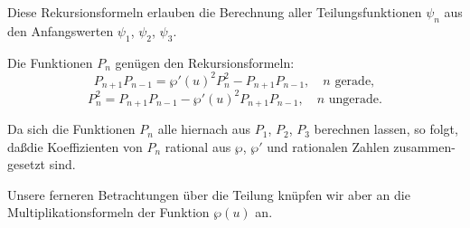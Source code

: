 \documentclass[12pt,a4paper]{article}
\theoremstyle{definition}
\begin{document}
Diese Rekursionsformeln erlauben die Berechnung aller
Teilungsfunktionen $\psi_n$ aus den Anfangswerten $\psi_1$, $\psi_2$, $\psi_3$.

Die Funktionen $P_n$ gen\"{u}gen den Rekursionsformeln:
\begin{equation}\tag{6}
P_{n+1}P_{n-1} = \wp'(u)^2 P_n^2 - P_{n+1}P_{n-1}, \quad n \text{ gerade},
\end{equation}
\begin{equation}\tag{7}
P_n^2 = P_{n+1}P_{n-1} - \wp'(u)^2 P_{n+1}P_{n-1}, \quad n \text{ ungerade}.
\end{equation}

Da sich die Funktionen $P_n$ alle hiernach aus $P_1$, $P_2$, $P_3$
berechnen lassen, so folgt, da\ss die Koeffizienten von $P_n$
rational aus $\wp$, $\wp'$ und rationalen Zahlen zusammen-
gesetzt sind.

Unsere ferneren Betrachtungen \"{u}ber die Teilung kn\"{u}pfen
wir aber an die Multiplikationsformeln der Funktion
$\wp(u)$ an.
\end{document}
